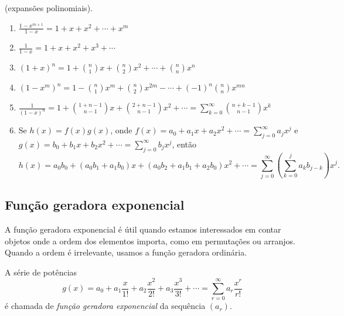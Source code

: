 \documentclass{article}
\begin{document}
\begin{prop} (expansões polinomiais).
    \begin{enumerate}
        \item[\textup{(a)}] \(\displaystyle\frac{1-x^{m+1}}{1-x} = 1 + x + x^2 + \cdots + x^m\)
        \item[\textup{(b)}] \(\displaystyle\frac{1}{1-x} = 1 + x + x^2 + x^3 + \cdots\)
        \item[\textup{(c)}] \((1+x)^n = \displaystyle 1 + \binom{n}{1} x + \binom{n}{2} x^2 + \cdots + \binom{n}{n} x^n\)
        \item[\textup{(d)}] \((1-x^m)^n = \displaystyle 1 - \binom{n}{1} x^m + \binom{n}{2} x^{2m} - \cdots + (-1)^n \binom{n}{n} x^{mn}\)
        \item[\textup{(e)}] \(\displaystyle \frac{1}{(1-x)^n} = \displaystyle 1 + \binom{1+n-1}{n-1} x + \binom{2+n-1}{n-1} x^2 + \cdots = \sum_{k=0}^{\infty} \binom{n+k-1}{n-1} x^k\)
        \item[\textup{(f)}] Se \(h(x)=f(x)g(x)\), onde \(\displaystyle f(x)=a_0 + a_1 x + a_2 x^2 + \cdots = \sum_{j=0}^{\infty} a_j x^j\) e \(\displaystyle g(x)=b_0 + b_1 x + b_2 x^2 + \cdots = \sum_{j=0}^{\infty} b_j x^j\), então
        \begin{equation}
            h(x) = a_0b_0 + (a_0b_1 + a_1b_0)x + (a_0b_2 + a_1b_1 + a_2b_0)x^2 + \cdots = \sum_{j=0}^{\infty} \left( \sum_{k=0}^{j} a_k b_{j-k} \right) x^j.
        \end{equation}
    \end{enumerate}
\end{prop}

\subsection{Função geradora exponencial}

A função geradora exponencial é útil quando estamos interessados em contar objetos onde a ordem dos elementos importa, como em permutações ou arranjos. Quando a ordem é irrelevante, usamos a função geradora ordinária.

\begin{defn}
    A série de potências
    \begin{equation}
        g(x) = a_0 + a_1 \frac{x}{1!} + a_2 \frac{x^2}{2!} + a_3 \frac{x^3}{3!} + \cdots = \sum_{r=0}^{\infty} a_r \frac{x^r}{r!}
    \end{equation}
    \noindent é chamada de \emph{função geradora exponencial} da sequência \((a_r)\).
\end{defn}
\end{document}
